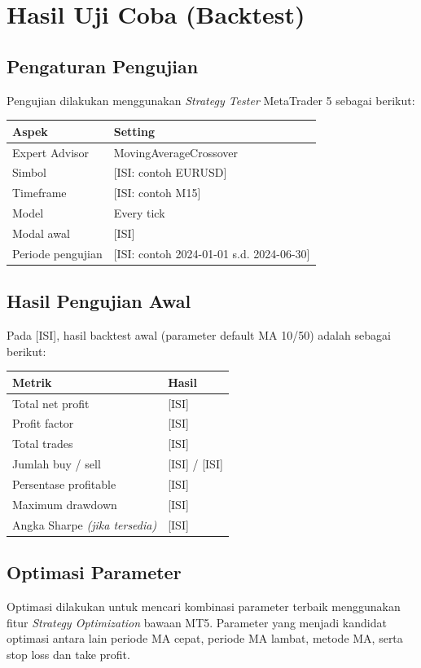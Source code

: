\documentclass[12pt,a4paper]{article}
\begin{document}
\section{Hasil Uji Coba (Backtest)}

\subsection{Pengaturan Pengujian}
Pengujian dilakukan menggunakan \textit{Strategy Tester} MetaTrader 5 sebagai berikut:

\begin{longtable}{@{}p{}p{}@{}}
\toprule
\textbf{Aspek} & \textbf{Setting} \\
\midrule
Expert Advisor & MovingAverageCrossover \\
Simbol & [ISI: contoh EURUSD] \\
Timeframe & [ISI: contoh M15] \\
Model & Every tick \\
Modal awal & [ISI] \\
Periode pengujian & [ISI: contoh 2024-01-01 s.d. 2024-06-30] \\
\bottomrule
\end{longtable}

\subsection{Hasil Pengujian Awal}
Pada [ISI], hasil backtest awal (parameter default MA 10/50) adalah sebagai berikut:

\begin{longtable}{@{}p{}p{}@{}}
\toprule
\textbf{Metrik} & \textbf{Hasil} \\
\midrule
Total net profit & [ISI] \\
Profit factor & [ISI] \\
Total trades & [ISI] \\
Jumlah buy / sell & [ISI] / [ISI] \\
Persentase profitable & [ISI] \\
Maximum drawdown & [ISI] \\
Angka Sharpe \textit{(jika tersedia)} & [ISI] \\
\bottomrule
\end{longtable}

\newpage
\subsection{Optimasi Parameter}
Optimasi dilakukan untuk mencari kombinasi parameter terbaik menggunakan fitur
\textit{Strategy Optimization} bawaan MT5. Parameter yang menjadi kandidat optimasi antara
lain periode MA cepat, periode MA lambat, metode MA, serta stop loss dan take profit.
\end{document}
